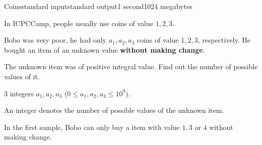 \begin{problem}{Coins}{standard input}{standard output}{1 second}{1024 megabytes}

In ICPCCamp, people usually use coins of value $1, 2, 3$. 

Bobo was very poor, he had only $a_1, a_2, a_3$ coins of value $1, 2, 3$, respectively.
He bought an item of an unknown value \textbf{without making change}.

The unknown item was of positive integral value. 
Find out the number of possible values of it.


\InputFile
$3$ integers $a_1, a_2, a_3$ ($0 \leq a_1, a_2, a_3 \leq 10^9$). 

\OutputFile
An integer denotes the number of possible values of the unknown item.

\Examples

\begin{example}
%
%
\end{example}

\Note
In the first sample, Bobo can only buy a item with value $1, 3$ or $4$ without making change.

\end{problem}

